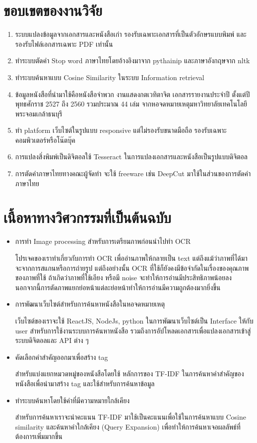 \section{ขอบเขตของงานวิจัย}
\begin{enumerate}
    \item ระบบแปลงข้อมูลจากเอกสารและหนังสือเก่า รองรับเฉพาะเอกสารที่เป็นตัวอักษรแบบพิมพ์ และรองรับไฟล์เอกสารเฉพาะ PDF เท่านั้น
    \item ทำระบบตัดคำ Stop word ภาษาไทยโดยอ้างอิงมาจาก pythainip และภาษาอังกฤษจาก nltk
    \item ทำระบบค้นหาแบบ Cosine Similarity ในระบบ Information retrieval
    \item ข้อมูลหนังสือที่นำมาใช้คือหนังสือจำพวก งานแสดงกตเวทิตาจิต เอกสารรายงานประจำปี ตั้งแต่ปีพุทธศักราช 2527 ถึง 2560 รวมประมาณ 44 เล่ม จากหอจดหมายเหตุมหาวิทยาลัยเทคโนโลยีพระจอมเกล้าธนบุรี
    \item ทำ platform เว็บไซต์ในรูปแบบ responsive แต่ไม่รองรับขนาดมือถือ รองรับเฉพาะคอมพิวเตอร์หรือโน๊ตบุ๊ค
    \item การแปลงสิ่งพิมพ์เป็นดิจิตอลใช้ Tesseract ในการแปลงเอกสารและหนังสือเป็นรูปแบบดิจิตอล
    \item การตัดคำภาษาไทยทางคณะผู้จัดทำ จะใช้ freeware เช่น DeepCut มาใช้ในส่วนของการตัดคำภาษาไทย
\end{enumerate}
\section{เนื้อหาทางวิศวกรรมที่เป็นต้นฉบับ}
\begin{itemize}
    \item การทำ Image processing สำหรับการเตรียมภาพก่อนนำไปทำ OCR 
    
    โปรเจคของเราทำเกี่ยวกับการทำ OCR เพื่ออ่านภาพให้กลายเป็น text แต่ถึงแม้ว่าภาพที่ได้มาจะจากการสแกนหรือการถ่ายรูป แต่ถึงอย่างนั้น OCR ที่ใช้ก็ยังคงมีข้อจำกัดในเรื่องของคุณภาพของภาพที่ใช้ ถ้าเกิดว่าภาพที่ใช้เอียง หรือมี noise จะทำให้การอ่านมีประสิทธิภาพน้อยลง นอกจากนี้การตัดภาพแยกย่อหน้าแต่ละย่อหน้าทำให้การอ่านมีความถูกต้องมากยิ่งขึ้น

    \item การพัฒนาเว็บไซต์สำหรับการค้นหาหนังสือในหอจดหมายเหตุ
    
    เว็บไซต์ของเราจะใช้ ReactJS, NodeJs, python  ในการพัฒนาเว็บไซต์เป็น Interface ให้กับ user สำหรับการใช้งานระบบการค้นหาหนังสือ รวมถึงการอัปโหลดเอกสารเพื่อแปลงเอกสารเข้าสู่ระบบดิจิตอลและ API ต่าง ๆ
    
    \item คัดเลือกคำสำคัญออกมาเพื่อสร้าง tag 
    
    สำหรับแบ่งแยกหมวดหมู่ของหนังสือโดยใช้ หลักการของ TF-IDF ในการค้นหาคำสำคัญของหนังสือเพื่อนำมาสร้าง tag และใช้สำหรับการค้นหาข้อมูล
    
    \item ทำระบบค้นหาโดยใช้คำที่มีความหมายใกล้เคียง
    
    สำหรับการค้นหาเราจะนำคะแนน TF-IDF มาใช้เป็นคะแนนเพื่อใช้ในการค้นหาแบบ Cosine similarity และค้นหาคำใกล้เคียง (Query Expansion) เพื่อทำให้การค้นหาเจอผลลัพธ์ที่ต้องการเพิ่มมากขึ้น
    
\end{itemize}
